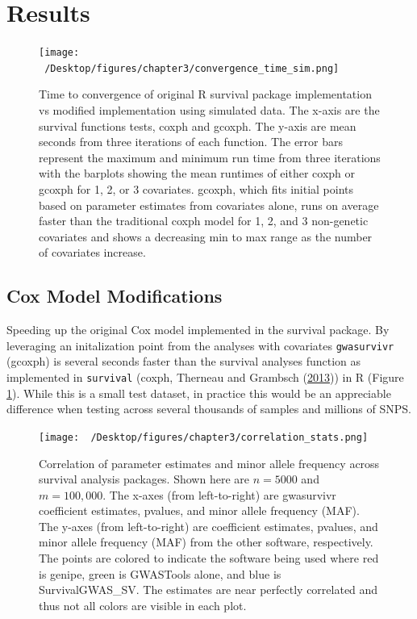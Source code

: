 \documentclass[]{DissertateOSU}
\begin{document}
\section{Results}\label{results-1}

\begin{figure}
    \centering
    \texttt{[image: ~/Desktop/figures/chapter3/convergence\_time\_sim.png]}
    \caption[Time to convergence of original R survival package implementation vs. modified implementation using simulated data.]{Time to convergence of original R survival package implementation vs modified implementation using simulated data. The x-axis are the survival functions tests, coxph and gcoxph. The y-axis are mean seconds from three iterations of each function. The error bars represent the maximum and minimum run time from three iterations with the barplots showing the mean runtimes of either coxph or gcoxph for 1, 2, or 3 covariates. gcoxph, which fits initial points based on parameter estimates from covariates alone, runs on average faster than the traditional coxph model for 1, 2, and 3 non-genetic covariates and shows a decreasing min to max range as the number of covariates increase.}  
    \label{fig:conv_plot}  
\end{figure}

\subsection{Cox Model Modifications}\label{cox-model-modifications}

Speeding up the original Cox model implemented in the survival package.
By leveraging an initalization point from the analyses with covariates
\texttt{gwasurvivr} (gcoxph) is several seconds faster than the survival
analyses function as implemented in \texttt{survival} (coxph, Therneau
and Grambsch (\protect\hyperlink{ref-therneau2013}{2013})) in R (Figure
\ref{fig:conv_plot}). While this is a small test dataset, in practice
this would be an appreciable difference when testing across several
thousands of samples and millions of SNPS.

\begin{figure}
    \centering
    \texttt{[image: ~/Desktop/figures/chapter3/correlation\_stats.png]}
    \caption[Correlation of parameter estimates and minor allele frequency across survival analysis packages.]{Correlation of parameter estimates and minor allele frequency across survival analysis packages. Shown here are $n=5000$ and $m=100,000$. The x-axes (from left-to-right) are gwasurvivr coefficient estimates, pvalues, and minor allele frequency (MAF). The y-axes  (from left-to-right) are coefficient estimates, pvalues, and minor allele frequency (MAF) from the other software, respectively. The points are colored to indicate the software being used where red is genipe, green is GWASTools alone, and blue is SurvivalGWAS\_SV. The estimates are near perfectly correlated and thus not all colors are visible in each plot.}  
    \label{fig:corr_plot}  
\end{figure}
\end{document}
